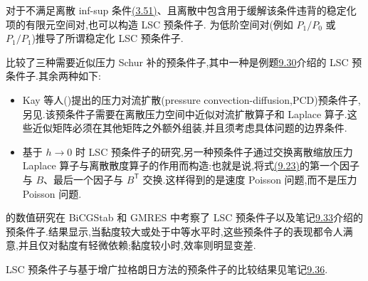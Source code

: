 
\begin{note}
\label{note:chapter9-stabilized-lsc}
对于不满足离散 inf-sup 条件\hyperref[eq:discrete-infsup-condition]{(3.51)}、且离散中包含用于缓解该条件违背的稳定化项的有限元空间对,也可以构造 LSC 预条件子.\textcite{Elman2008a} 为低阶空间对(例如 $P_1/P_0$ 或 $P_1/P_1$)推导了所谓稳定化 LSC 预条件子.
\end{note}


\begin{note}
\label{note:chapter9-other-schur-preconditioners}
\textcite{OlshanskiiVassilevski2007}比较了三种需要近似压力 Schur 补的预条件子,其中一种是例题\hyperref[ex:chapter9-lsc-preconditioner]{9.30}介绍的 LSC 预条件子.其余两种如下:
\begin{itemize}
  \item Kay 等人(\textcite{Kay2002})提出的压力对流扩散(pressure convection-diffusion,PCD)预条件子,另见\textcite[第 9.2.1 节]{Elman2014}.该预条件子需要在离散压力空间中近似对流扩散算子和 Laplace 算子.这些近似矩阵必须在其他矩阵之外额外组装,并且须考虑具体问题的边界条件.
  \item 基于 $h\to0$ 时 LSC 预条件子的研究,另一种预条件子通过交换离散缩放压力 Laplace 算子与离散散度算子的作用而构造:也就是说,将式\hyperref[eq:chapter9-lsc-schur-inverse]{(9.23)}的第一个因子与 $B$、最后一个因子与 $B^{\mathsf T}$ 交换.这样得到的是速度 Poisson 问题,而不是压力 Poisson 问题.
\end{itemize}
\end{note}


\begin{note}
\label{note:chapter9-lsc-numerical-experience}
\textcite{OlshanskiiVassilevski2007}的数值研究在 BiCGStab 和 GMRES 中考察了 LSC 预条件子以及笔记\hyperref[note:chapter9-other-schur-preconditioners]{9.33}介绍的预条件子.结果显示,当黏度较大或处于中等水平时,这些预条件子的表现都令人满意,并且仅对黏度有轻微依赖;黏度较小时,效率则明显变差.

LSC 预条件子与基于增广拉格朗日方法的预条件子的比较结果见笔记\hyperref[note:chapter9-augmented-lagrangian-experience]{9.36}.
\end{note}


